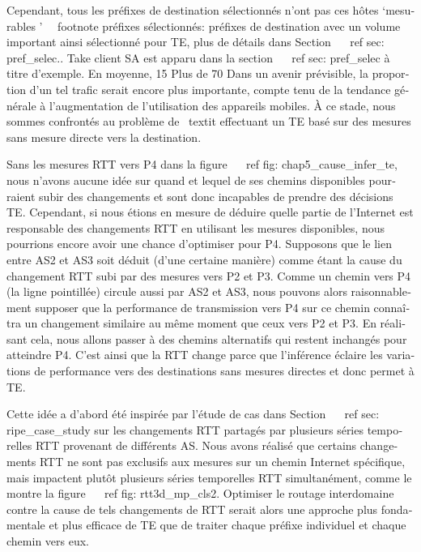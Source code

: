 \begin{otherlanguage}{french}
{{{%
Cependant, tous les préfixes de destination sélectionnés n'ont pas ces hôtes `mesurables '~ \ footnote {préfixes sélectionnés: préfixes de destination avec un volume important ainsi sélectionné pour TE, plus de détails dans Section ~ \ ref {sec: pref_selec}.}.
Take client SA est apparu dans la section ~ \ ref {sec: pref_selec} à titre d'exemple.
En moyenne, 15%
Plus de 70%
Dans un avenir prévisible, la proportion d'un tel trafic serait encore plus importante, compte tenu de la tendance générale à l'augmentation de l'utilisation des appareils mobiles.
À ce stade, nous sommes confrontés au problème de \ textit {effectuant un TE basé sur des mesures sans mesure directe vers la destination}.

Sans les mesures RTT vers P4 dans la figure ~ \ ref {fig: chap5_cause_infer_te}, nous n'avons aucune idée sur quand et lequel de ses chemins disponibles pourraient subir des changements et sont donc incapables de prendre des décisions TE.
Cependant, si nous étions en mesure de déduire quelle partie de l'Internet est responsable des changements RTT en utilisant les mesures disponibles, nous pourrions encore avoir une chance d'optimiser pour P4.
Supposons que le lien entre AS2 et AS3 soit déduit (d'une certaine manière) comme étant la cause du changement RTT subi par des mesures vers P2 et P3.
Comme un chemin vers P4 (la ligne pointillée) circule aussi par AS2 et AS3, nous pouvons alors raisonnablement supposer que la performance de transmission vers P4 sur ce chemin connaîtra un changement similaire au même moment que ceux vers P2 et P3.
En réalisant cela, nous allons passer à des chemins alternatifs qui restent inchangés pour atteindre P4.
C'est ainsi que la RTT change parce que l'inférence éclaire les variations de performance vers des destinations sans mesures directes et donc permet à TE.

Cette idée a d'abord été inspirée par l'étude de cas dans Section ~ \ ref {sec: ripe_case_study} sur les changements RTT partagés par plusieurs séries temporelles RTT provenant de différents AS.
Nous avons réalisé que certains changements RTT ne sont pas exclusifs aux mesures sur un chemin Internet spécifique, mais impactent plutôt plusieurs séries temporelles RTT simultanément, comme le montre la figure ~ \ ref {fig: rtt3d_mp_cls2}.
Optimiser le routage interdomaine contre la cause de tels changements de RTT serait alors une approche plus fondamentale et plus efficace de TE que de traiter chaque préfixe individuel et chaque chemin vers eux.

}}}
\end{otherlanguage}
